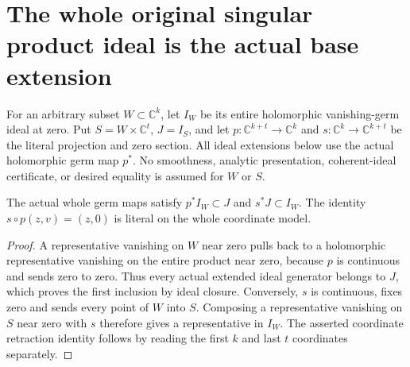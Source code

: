 \section{The whole original singular product ideal is the actual base extension}

For an arbitrary subset $W\subset\mathbb C^k$, let $I_W$ be its entire
holomorphic vanishing-germ ideal at zero. Put $S=W\times\mathbb C^t$,
$J=I_S$, and let $p:\mathbb C^{k+t}\to\mathbb C^k$ and
$s:\mathbb C^k\to\mathbb C^{k+t}$ be the literal projection and zero
section. All ideal extensions below use the actual holomorphic germ map
$p^*$. No smoothness, analytic presentation, coherent-ideal certificate,
or desired equality is assumed for $W$ or $S$.

\begin{lemma}
\label{hir:actual-cylinder-base-extension-trace}
\leanok
The actual whole germ maps satisfy $p^*I_W\subset J$ and $s^*J\subset I_W$.
The identity $s\circ p(z,v)=(z,0)$ is literal on the whole coordinate model.
\end{lemma}
\begin{proof}
A representative vanishing on $W$ near zero pulls back to a holomorphic
representative vanishing on the entire product near zero, because $p$
is continuous and sends zero to zero. Thus every actual extended ideal
generator belongs to $J$, which proves the first inclusion by ideal
closure. Conversely, $s$ is continuous, fixes zero and sends every
point of $W$ into $S$. Composing a representative vanishing on $S$ near
zero with $s$ therefore gives a representative in $I_W$. The asserted
coordinate retraction identity follows by reading the first $k$ and
last $t$ coordinates separately.
\end{proof}

